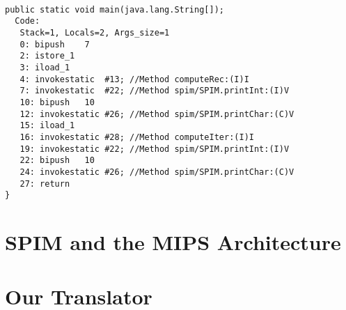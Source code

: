 \documentclass[8pt,a4paper,compress]{beamer}
\begin{document}
\begin{frame}[fragile]
\pause

\begin{lstlisting}[language={}]

public static void main(java.lang.String[]);
  Code:
   Stack=1, Locals=2, Args_size=1
   0: bipush    7
   2: istore_1
   3: iload_1
   4: invokestatic  #13; //Method computeRec:(I)I
   7: invokestatic  #22; //Method spim/SPIM.printInt:(I)V
   10: bipush   10
   12: invokestatic #26; //Method spim/SPIM.printChar:(C)V
   15: iload_1
   16: invokestatic #28; //Method computeIter:(I)I
   19: invokestatic #22; //Method spim/SPIM.printInt:(I)V
   22: bipush   10
   24: invokestatic #26; //Method spim/SPIM.printChar:(C)V
   27: return
}
\end{lstlisting}
\end{frame}

\section{SPIM and the MIPS Architecture}
\begin{frame}[fragile]
\pause

\end{frame}

\section{Our Translator}
\begin{frame}[fragile]
\pause

\end{frame}
\end{document}

